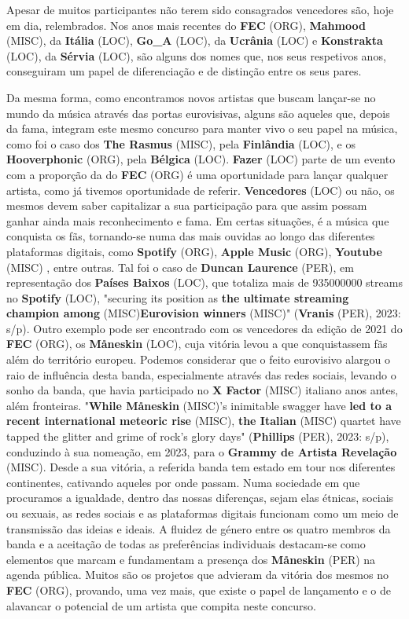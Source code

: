\documentclass[12pt,a4paper]{article}
\begin{document}
Apesar de muitos participantes não terem sido consagrados vencedores são, hoje em dia, relembrados. Nos anos mais recentes do \textbf{FEC} (ORG), \textbf{Mahmood} (MISC), da \textbf{Itália} (LOC), \textbf{Go\_A} (LOC), da \textbf{Ucrânia} (LOC) e \textbf{Konstrakta} (LOC), da \textbf{Sérvia} (LOC), são alguns dos nomes que, nos seus respetivos anos, conseguiram um papel de diferenciação e de distinção entre os seus pares.

Da  mesma  forma,  como  encontramos  novos  artistas  que  buscam  lançar-se  no mundo da música através das portas eurovisivas, alguns são aqueles que, depois da fama, integram este mesmo concurso para manter vivo o seu papel na música, como foi o caso dos  \textbf{The  Rasmus} (MISC),  pela  \textbf{Finlândia} (LOC),  e  os  \textbf{Hooverphonic} (ORG),  pela  \textbf{Bélgica} (LOC).  \textbf{Fazer} (LOC)  parte  de  um evento com a proporção da do \textbf{FEC} (ORG) é uma oportunidade para lançar qualquer artista, como já  tivemos  oportunidade  de  referir.  \textbf{Vencedores} (LOC)  ou  não,  os  mesmos  devem  saber capitalizar a sua participação para que assim possam ganhar ainda mais reconhecimento e fama. Em certas situações, é a música que conquista os fãs, tornando-se numa das mais ouvidas ao longo das diferentes plataformas digitais, como \textbf{Spotify} (ORG), \textbf{Apple Music} (ORG), \textbf{Youtube} (MISC) , entre outras. Tal foi o caso de \textbf{Duncan Laurence} (PER), em representação dos \textbf{Países Baixos} (LOC), que totaliza  mais  de  935000000 streams no  \textbf{Spotify} (LOC),  "securing  its  position  as  \textbf{the  ultimate streaming  champion  among} (MISC)\textbf{Eurovision  winners} (MISC)"  (\textbf{Vranis} (PER),  2023:  s/p).  Outro  exemplo pode ser encontrado com os vencedores da edição de 2021 do \textbf{FEC} (ORG), os \textbf{Måneskin} (LOC), cuja vitória levou a que conquistassem fãs além do território europeu. Podemos considerar que o  feito  eurovisivo  alargou  o  raio  de  influência  desta  banda,  especialmente  através  das redes sociais, levando o sonho da banda, que havia participado no \textbf{X Factor} (MISC) italiano anos antes,  além  fronteiras.  "\textbf{While  Måneskin} (MISC)'s  inimitable  swagger  have  \textbf{led  to  a  recent international meteoric rise} (MISC), \textbf{the Italian} (MISC) quartet have tapped the glitter and grime of rock's glory days" (\textbf{Phillips} (PER), 2023: s/p), conduzindo à sua nomeação, em 2023, para o \textbf{Grammy de  Artista  Revelação} (MISC).  Desde  a  sua  vitória,  a  referida  banda  tem  estado  em tour nos diferentes  continentes,  cativando  aqueles  por  onde  passam.  Numa  sociedade  em  que procuramos  a  igualdade,  dentro  das  nossas  diferenças,  sejam  elas  étnicas,  sociais  ou sexuais,  as  redes  sociais  e  as  plataformas  digitais  funcionam  como  um  meio  de transmissão das ideias e ideais. A fluidez de género entre os quatro membros da banda e a aceitação de todas as preferências individuais destacam-se como elementos que marcam e fundamentam a presença dos \textbf{Måneskin} (PER) na agenda pública. Muitos são os projetos que advieram da vitória dos mesmos no \textbf{FEC} (ORG), provando, uma vez mais, que existe o papel de lançamento e o de alavancar o potencial de um artista que compita neste concurso.
\end{document}

